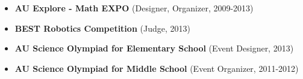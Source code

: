 \documentclass{article}
\begin{document}
\begin{itemize}
  \item
    \textbf{AU Explore - Math EXPO} (Designer, Organizer, 2009-2013)


  \item
    \textbf{BEST Robotics Competition} (Judge, 2013)

  \item
    \textbf{AU Science Olympiad for Elementary School} (Event Designer, 2013)

  \item
    \textbf{AU Science Olympiad for Middle School} (Event Organizer, 2011-2012)
\end{itemize}


\vfill
\end{document}
